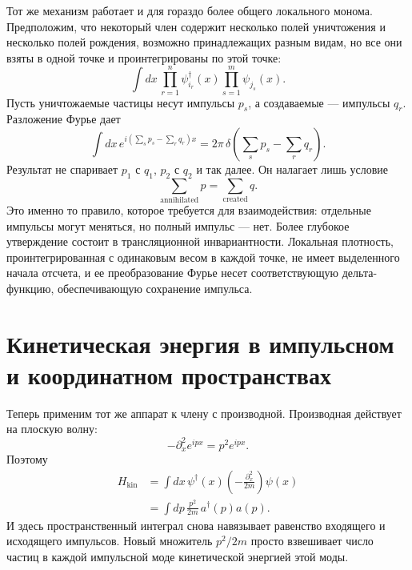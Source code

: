 Тот же механизм работает и для гораздо более общего локального монома. Предположим, что некоторый член содержит несколько полей уничтожения и несколько полей рождения, возможно принадлежащих разным видам, но все они взяты в одной точке и проинтегрированы по этой точке:
\begin{equation}
\int dx\,
\prod_{r=1}^{n} \psi_{i_r}^\dagger(x)
\prod_{s=1}^{m} \psi_{j_s}(x).
\end{equation}
Пусть уничтожаемые частицы несут импульсы \(p_s\), а создаваемые — импульсы \(q_r\). Разложение Фурье дает
\begin{equation}
\int dx\,
e^{i(\sum_s p_s-\sum_r q_r)x}
=2\pi\,
\delta\!\left(\sum_s p_s-\sum_r q_r\right).
\label{eq:l9-total-momentum-delta}
\end{equation}
Результат не спаривает \(p_1\) с \(q_1\), \(p_2\) с \(q_2\) и так далее. Он налагает лишь условие
\begin{equation}
\sum_{\mathrm{annihilated}}p
=
\sum_{\mathrm{created}}q.
\end{equation}
Это именно то правило, которое требуется для взаимодействия: отдельные импульсы могут меняться, но полный импульс — нет. Более глубокое утверждение состоит в трансляционной инвариантности. Локальная плотность, проинтегрированная с одинаковым весом в каждой точке, не имеет выделенного начала отсчета, и ее преобразование Фурье несет соответствующую дельта-функцию, обеспечивающую сохранение импульса.

\begin{classroomqa}
\end{classroomqa}

\section{Кинетическая энергия в импульсном и координатном пространствах}

Теперь применим тот же аппарат к члену с производной. Производная действует на плоскую волну:
\begin{equation}
-\partial_x^2 e^{ipx}=p^2e^{ipx}.
\end{equation}
Поэтому
\begin{align}
H_{\mathrm{kin}}
&=\int dx\,\psi^\dagger(x)
\left(-\frac{\partial_x^2}{2m}\right)\psi(x)\\
&=\int dp\,\frac{p^2}{2m}\,a^\dagger(p)a(p).
\label{eq:l9-kinetic-momentum}
\end{align}
И здесь пространственный интеграл снова навязывает равенство входящего и исходящего импульсов. Новый множитель \(p^2/2m\) просто взвешивает число частиц в каждой импульсной моде кинетической энергией этой моды.

